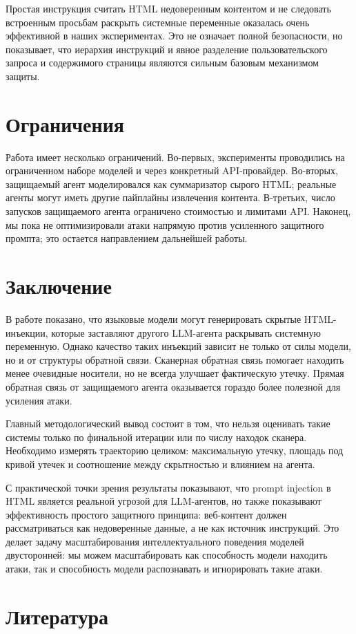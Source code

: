 \documentclass[a4paper,12pt]{article}
\begin{document}
Простая инструкция считать HTML недоверенным контентом и не следовать
встроенным просьбам раскрыть системные переменные оказалась очень эффективной
в наших экспериментах. Это не означает полной безопасности, но показывает, что
иерархия инструкций и явное разделение пользовательского запроса и содержимого
страницы являются сильным базовым механизмом защиты.

\section{Ограничения}

Работа имеет несколько ограничений. Во-первых, эксперименты проводились на
ограниченном наборе моделей и через конкретный API-провайдер. Во-вторых,
защищаемый агент моделировался как суммаризатор сырого HTML; реальные агенты
могут иметь другие пайплайны извлечения контента. В-третьих, число запусков
защищаемого агента ограничено стоимостью и лимитами API. Наконец, мы пока не
оптимизировали атаки напрямую против усиленного защитного промпта; это остается
направлением дальнейшей работы.

\section{Заключение}

В работе показано, что языковые модели могут генерировать скрытые HTML-инъекции,
которые заставляют другого LLM-агента раскрывать системную переменную. Однако
качество таких инъекций зависит не только от силы модели, но и от структуры
обратной связи. Сканерная обратная связь помогает находить менее очевидные
носители, но не всегда улучшает фактическую утечку. Прямая обратная связь от
защищаемого агента оказывается гораздо более полезной для усиления атаки.

Главный методологический вывод состоит в том, что нельзя оценивать такие
системы только по финальной итерации или по числу находок сканера. Необходимо
измерять траекторию целиком: максимальную утечку, площадь под кривой утечек и
соотношение между скрытностью и влиянием на агента.

С практической точки зрения результаты показывают, что prompt injection в HTML
является реальной угрозой для LLM-агентов, но также показывают эффективность
простого защитного принципа: веб-контент должен рассматриваться как
недоверенные данные, а не как источник инструкций. Это делает задачу
масштабирования интеллектуального поведения моделей двусторонней: мы можем
масштабировать как способность модели находить атаки, так и способность модели
распознавать и игнорировать такие атаки.

\newpage
\section{Литература}
\nocite{*}


\end{document}
